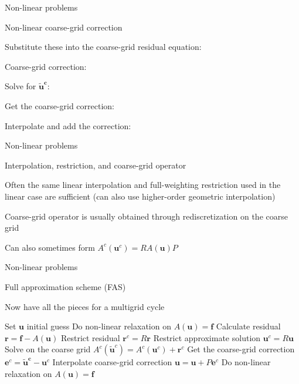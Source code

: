 \documentclass[18pt,xcolor=table]{beamer}
\begin{document}
\begin{frame}{Non-linear problems}
\begin{block}{Non-linear coarse-grid correction}
\bit
\item Substitute these into the coarse-grid residual equation:
\item Coarse-grid correction:
\bit
\item Solve for $\mathbf{\tilde{u}^c}$: 
\item Get the coarse-grid correction:
\item Interpolate and add the correction:
\eit
\eit
\end{block}
\end{frame}

\begin{frame}{Non-linear problems}
\begin{block}{Interpolation, restriction, and coarse-grid operator}
\bit
\item Often the same linear interpolation and full-weighting restriction used in the linear case are sufficient (can also use higher-order geometric interpolation)
\item Coarse-grid operator is usually obtained through rediscretization on the coarse grid
\item Can also sometimes form $A^c(\mathbf{u}^c) = RA(\mathbf{u})P$
\eit 
\end{block}
\end{frame}

\begin{frame}{Non-linear problems}
\begin{block}{Full approximation scheme (FAS)}
\bit
\item Now have all the pieces for a multigrid cycle
\begin{algorithm}[H]
\caption{Full approximation scheme (FAS) two-grid cycle}
\begin{algorithmic}
\State Set $\mathbf{u}$ initial guess
\State Do non-linear relaxation on $A(\mathbf{u}) = \mathbf{f}$
\State Calculate residual $\mathbf{r} = \mathbf{f} - A(\mathbf{u})$
\State Restrict residual $\mathbf{r}^c = R\mathbf{r}$
\State Restrict approximate solution $\mathbf{u}^c = R\mathbf{u}$
\State Solve on the coarse grid $A^c(\mathbf{\tilde{u}}^c) = A^c(\mathbf{u}^c) + \mathbf{r}^c$
\State Get the coarse-grid correction $\mathbf{e}^c = \mathbf{\tilde{u}^c} - \mathbf{u}^c$
\State Interpolate coarse-grid correction $\mathbf{u} = \mathbf{u} + P\mathbf{e}^c$
\State Do non-linear relaxation on $A(\mathbf{u}) = \mathbf{f}$
\end{algorithmic}
\end{algorithm}
\eit
\end{block}
\end{frame}
\end{document}
